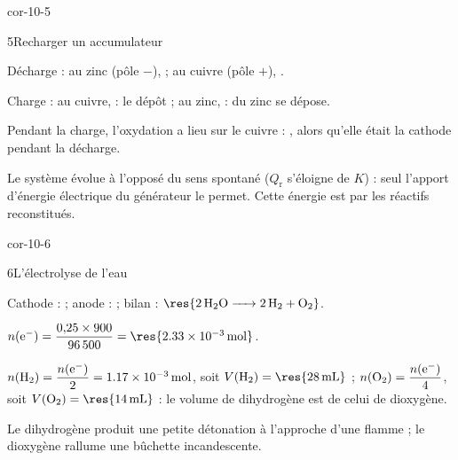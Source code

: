 \begin{blocLivre}{cor-10-5}
\begin{corrige}{5}{Recharger un accumulateur}
\begin{questions}
\item Décharge : au zinc (pôle $-$),  ; au cuivre (pôle $+$), .
\item Charge : au cuivre,  : le dépôt  ; au zinc,
 : du zinc se dépose.
\item Pendant la charge, l'oxydation a lieu sur le cuivre : , alors
qu'elle était la cathode pendant la décharge.
\item Le système évolue à l'opposé du sens spontané ($Q_\mathrm{r}$ s'éloigne de $K$) : seul l'apport d'énergie
électrique du générateur le permet. Cette énergie est  par les réactifs
reconstitués.
\end{questions}
\end{corrige}
\end{blocLivre}
\begin{blocLivre}{cor-10-6}
\begin{corrige}{6}{L'électrolyse de l'eau}
\begin{questions}
\item Cathode :  ; anode :  ; bilan :
$\res{\ce{2 H2O -> 2 H2 + O2}}$.
\item $n(\mathrm{e}^-)=\dfrac{0{,}25\times900}{\num{96500}}=\res{\qty{2,33e-3}{mol}}$.
\item $n(\ce{H2})=\dfrac{n(\mathrm{e}^-)}{2}=\qty{1,17e-3}{mol}$, soit $V(\ce{H2})=\res{\qty{28}{mL}}$ ;
$n(\ce{O2})=\dfrac{n(\mathrm{e}^-)}{4}$, soit $V(\ce{O2})=\res{\qty{14}{mL}}$ : le volume de dihydrogène est
 de celui de dioxygène.
\item Le dihydrogène produit une petite détonation à l'approche d'une flamme ; le dioxygène rallume une bûchette
incandescente.
\end{questions}
\end{corrige}
\end{blocLivre}
